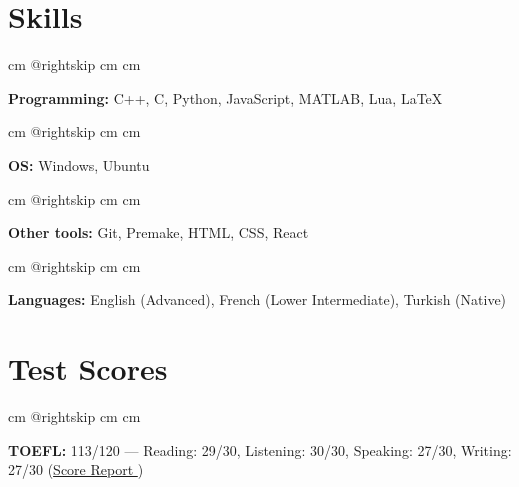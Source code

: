 \documentclass[10pt, a4paper]{article}
\let\hrefWithoutArrow\href
\renewcommand{\href}[2]{\hrefWithoutArrow{#1}{#2 \raisebox{.15ex}{\footnotesize \faExternalLink*}}}
\begin{document}
    \section{Skills}
    
            \begingroup    {} cm
            \advance\csname @rightskip cm
            \advance{} cm

            \textbf{Programming:} C++, C, Python, JavaScript, MATLAB, Lua, LaTeX

            \par\endgroup

        \vspace{0.2 cm}
            \begingroup    {} cm
            \advance\csname @rightskip cm
            \advance{} cm

            \textbf{OS:} Windows, Ubuntu

            \par\endgroup

        \vspace{0.2 cm}
            \begingroup    {} cm
            \advance\csname @rightskip cm
            \advance{} cm

            \textbf{Other tools:} Git, Premake, HTML, CSS, React

            \par\endgroup

        \vspace{0.2 cm}
            \begingroup    {} cm
            \advance\csname @rightskip cm
            \advance{} cm

            \textbf{Languages:} English (Advanced), French (Lower Intermediate), Turkish (Native)

            \par\endgroup



    \section{Test Scores}
    
            \begingroup    {} cm
            \advance\csname @rightskip cm
            \advance{} cm

            \textbf{TOEFL:} 113/120 — Reading: 29/30, Listening: 30/30, Speaking: 27/30, Writing: 27/30 (\href{https://example.com/}{Score Report})
\end{document}
